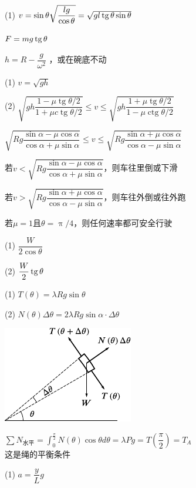 \answer (1) $v=\sin \theta \sqrt{\dfrac{l g}{\cos \theta}}=\sqrt{g l \operatorname{tg} \theta \sin \theta}$

\makebox[1.5em]{}$ F = m g \operatorname{tg} \theta   $

\answer $ h = R - \dfrac{ g }{\omega ^ 2} $ ，或在碗底不动

\answer (1) $ v = \sqrt { g h } $

(2) $\sqrt{g h \dfrac{1-\mu \operatorname{tg} \theta / 2}{1+\mu c \operatorname{tg} \theta / 2}} \leqslant v \leqslant \sqrt{g h \dfrac{1+\mu \operatorname{tg} \theta / 2}{1-\mu \operatorname{ctg} \theta / 2}}$

\answer $\sqrt{R g \dfrac{\sin \alpha-\mu \cos \alpha}{\cos \alpha+\mu \sin \alpha}} \leqslant v \leqslant \sqrt{R g \dfrac{\sin \alpha+\mu \cos \alpha}{\cos \alpha-\mu \sin \alpha}}$

若$  v < \sqrt{R g \dfrac{\sin \alpha-\mu \cos \alpha}{\cos \alpha+\mu \sin \alpha}}   $，则车往里倒或下滑

若$  v > \sqrt{R g \dfrac{\sin \alpha+\mu \cos \alpha}{\cos \alpha-\mu \sin \alpha}} $，则车往外倒或往外跑

若$ \mu = 1 $且$  \theta = \uppi / 4   $，则任何速率都可安全行驶

\answer (1) $ \dfrac { W } { 2 \cos \theta } $

(2) $ \dfrac { W } { 2 } \operatorname{tg} \theta  $

\answer (1) $ T \left( \theta \right) = \lambda R g \sin \theta  $

(2) $ N \left( \theta \right) \Delta \theta = 2 \lambda R g \sin \alpha \cdot \Delta \theta  $
\begin{figurex}
    \centering
    \includegraphics{figure/figa03.01}
    \caption{}
    \label{figa:03.01}
\end{figurex}

$\sum N _ {\text{水平}} = \displaystyle \int_{0}^{\frac{\pi}{2}} N(\theta) \cos \theta d \theta=\lambda P g=T\left(\dfrac{\pi}{2}\right)=T_{A}$\\
这是绳的平衡条件

\answer (1) $ a = \dfrac y L { g }   $\vspace{-0.5em}

